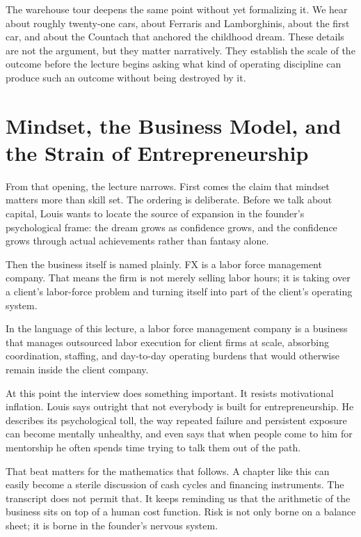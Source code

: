 The warehouse tour deepens the same point without yet formalizing it. We hear about roughly twenty-one cars, about Ferraris and Lamborghinis, about the first car, and about the Countach that anchored the childhood dream. These details are not the argument, but they matter narratively. They establish the scale of the outcome before the lecture begins asking what kind of operating discipline can produce such an outcome without being destroyed by it.

\section{Mindset, the Business Model, and the Strain of Entrepreneurship}

From that opening, the lecture narrows. First comes the claim that mindset matters more than skill set. The ordering is deliberate. Before we talk about capital, Louis wants to locate the source of expansion in the founder's psychological frame: the dream grows as confidence grows, and the confidence grows through actual achievements rather than fantasy alone.

Then the business itself is named plainly. FX is a labor force management company. That means the firm is not merely selling labor hours; it is taking over a client's labor-force problem and turning itself into part of the client's operating system.

\begin{definition}
In the language of this lecture, a labor force management company is a business that manages outsourced labor execution for client firms at scale, absorbing coordination, staffing, and day-to-day operating burdens that would otherwise remain inside the client company.
\end{definition}

At this point the interview does something important. It resists motivational inflation. Louis says outright that not everybody is built for entrepreneurship. He describes its psychological toll, the way repeated failure and persistent exposure can become mentally unhealthy, and even says that when people come to him for mentorship he often spends time trying to talk them out of the path.

That beat matters for the mathematics that follows. A chapter like this can easily become a sterile discussion of cash cycles and financing instruments. The transcript does not permit that. It keeps reminding us that the arithmetic of the business sits on top of a human cost function. Risk is not only borne on a balance sheet; it is borne in the founder's nervous system.

